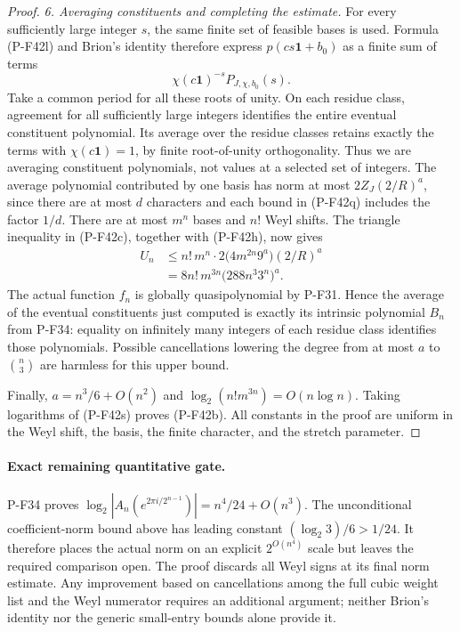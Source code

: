 \begin{proof}
\emph{6. Averaging constituents and completing the estimate.}
For every sufficiently large integer $s$, the same finite
set of feasible bases is used. Formula (P-F42l) and Brion's
identity therefore express $p(cs\mathbf1+b_0)$ as a finite
sum of terms
\[
              \chi(c\mathbf1)^{-s}P_{J,\chi,b_0}(s).
 \tag{P-F42r}
\]
Take a common period for all these roots of unity.
On each residue class, agreement for all sufficiently large
integers identifies the entire eventual constituent
polynomial. Its average over the residue classes retains
exactly the terms with $\chi(c\mathbf1)=1$, by finite
root-of-unity orthogonality. Thus we are averaging
constituent polynomials, not values at a selected set of
integers.
The average polynomial contributed by one basis has norm
at most $2Z_J(2/R)^a$, since there are at most $d$ characters
and each bound in (P-F42q) includes the factor $1/d$.
There are at most $m^n$ bases and $n!$ Weyl shifts.
The triangle inequality in (P-F42c), together with
(P-F42h), now gives
\[
 \begin{split}
 U_n
 &\le n!\,m^n\cdot
          2\bigl(4m^{2n}9^a\bigr)(2/R)^a\\
 &=8n!\,m^{3n}\bigl(288n^3 3^n\bigr)^a.
 \end{split}
 \tag{P-F42s}
\]
The actual function $f_n$ is globally quasipolynomial by
P-F31. Hence the average of the eventual constituents
just computed is exactly its intrinsic polynomial $B_n$
from P-F34: equality on infinitely many integers of
each residue class identifies those polynomials.
Possible cancellations lowering the degree from at most
$a$ to $\binom n3$ are harmless for this upper bound.

Finally, $a=n^3/6+O(n^2)$ and
$\log_2(n!m^{3n})=O(n\log n)$.
Taking logarithms of (P-F42s) proves (P-F42b).
All constants in the proof are uniform in the Weyl shift,
the basis, the finite character, and the stretch parameter.
\end{proof}

\paragraph{Exact remaining quantitative gate.}
P-F34 proves
$\log_2|A_n(e^{2\pi i/2^{n-1}})|=n^4/24+O(n^3)$.
The unconditional coefficient-norm bound above has leading
constant $(\log_2 3)/6>1/24$.
It therefore places the actual norm on an explicit
$2^{O(n^4)}$ scale but leaves the required comparison open.
The proof discards all Weyl signs at its final norm estimate.
Any improvement based on cancellations among the full cubic
weight list and the Weyl numerator requires an additional
argument; neither Brion's identity nor the generic
small-entry bounds alone provide it.
